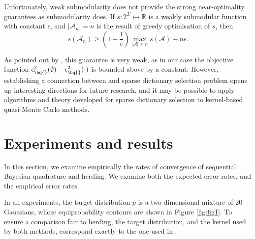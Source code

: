 Unfortunately, weak submodularity does not provide the strong near-optimality guarantees as submodularity does. If $s:2^\mathcal{X} \mapsto \mathbb{R}$ is a weakly submodular function with constant $\epsilon$, and $\vert\mathcal{A}_n\vert=n$ is the result of greedy optimisation of $s$, then
\begin{equation}
	s(\mathcal{A}_n) \geq \left(1-\frac{1}{e}\right)\max_{\vert\mathcal{A}\vert\leq n}s(\mathcal{A}) - n\epsilon.
\end{equation}

As pointed out by \citet{KrauseCevher10}, this guarantee is very weak, as in our case the objective function $\epsilon^{2}_{\bq{}}(\emptyset)-\epsilon^{2}_{\bq{}}(\cdot)$ is bounded above by a constant. However, establishing a connection between \sbq{} and sparse dictionary selection problem opens up interesting directions for future research, and it may be possible to apply algorithms and theory developed for sparse dictionary selection to kernel-based quasi-Monte Carlo methods.


\section{Experiments and results}\label{sec:herding_experiments}

In this section, we examine empirically the rates of convergence of sequential Bayesian quadrature and herding. We examine both the expected error rates, and the empirical error rates.

In all experiments, the target distribution $p$ is a two dimensional mixture of 20 Gaussians, whose equiprobability contours are shown in Figure \ref{fig:fig1}. To ensure a comparison fair to herding, the target distribution, and the kernel used by both methods, correspond exactly to the one used in \citep[Fig.\ 1]{Chen2010}.

